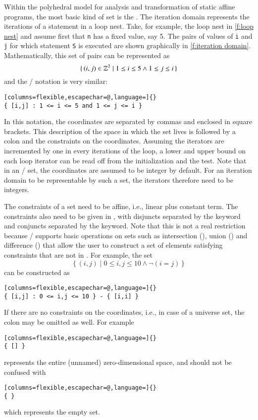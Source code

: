 Within the polyhedral model for analysis and transformation of
static affine programs, the most basic kind of set is the
.
The iteration domain represents the iterations of a statement in a loop nest.
Take, for example, the loop nest in \autoref{f:loop nest}
and assume first that \lstinline{n} has a fixed value, say 5.
The pairs of values of \lstinline{i} and \lstinline{j} for
which statement \lstinline{S} is executed are shown graphically
in \autoref{f:iteration domain}.
Mathematically, this set of pairs can be represented as
$$
\{\,
(i,j) \in \mathbb{Z}^2 \mid 1 \le i \le 5 \wedge 1 \le j \le i
\,\}
$$
and the \isl/ notation is very similar:
\begin{lstlisting}[columns=flexible,escapechar=@,language=]{}
{ [i,j] : 1 <= i <= 5 and 1 <= j <= i }
\end{lstlisting}
In this notation,
the coordinates are separated by commas and enclosed in square
brackets.  This description of the space in which the set lives
is followed by a colon and the constraints on the coordinates.
Assuming the iterators are incremented by one in every iterations
of the loop, a lower and upper bound on each loop iterator
can be read off from the initialization and the test.
Note that in an \iscc/ set,
the coordinates are assumed to be integer by default.
For an iteration domain to be representable by such a set,
the iterators therefore need to be integers.

The constraints of a set need to be affine, i.e., linear plus constant term.
The constraints also need to be given in , with disjuncts
separated by the  keyword and conjuncts separated
by the  keyword.
Note that this is not a real restriction because \iscc/ supports
basic operations on sets such as intersection (\ai[\tt]{*}),
union (\ai[\tt]{+}) and difference (\ai[\tt]{-}) that allow
the user to construct a set of elements satisfying constraints that
are not in .
For example, the set
$$
\{\,
(i,j) \mid 0 \le i,j \le 10 \wedge \lnot (i = j)
\,\}
$$
can be constructed as
\begin{lstlisting}[columns=flexible,escapechar=@,language=]{}
{ [i,j] : 0 <= i,j <= 10 } - { [i,i] }
\end{lstlisting}
If there are no constraints on the coordinates, i.e., in case of
a universe set, the colon may be omitted as well.
For example
\begin{lstlisting}[columns=flexible,escapechar=@,language=]{}
{ [] }
\end{lstlisting}
represents the entire (unnamed) zero-dimensional space,
and should not be confused with
\begin{lstlisting}[columns=flexible,escapechar=@,language=]{}
{ }
\end{lstlisting}
which represents the empty set.

